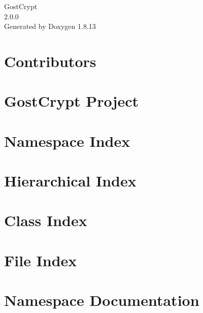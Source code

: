 \documentclass[twoside]{book}
\newcommand{\+}{\discretionary{\mbox{\scriptsize$\hookleftarrow$}}{}{}}
\newcommand{\clearemptydoublepage}{%
  \newpage{\pagestyle{empty}\cleardoublepage}%
}
\begin{document}
\hypersetup{pageanchor=false,
             bookmarksnumbered=true,
             pdfencoding=unicode
            }
\begin{titlepage}
\vspace*{7cm}
\begin{center}%
{\Large Gost\+Crypt \\[1ex]\large 2.\+0.\+0 }\\
\vspace*{1cm}
{\large Generated by Doxygen 1.8.13}\\
\end{center}
\end{titlepage}
\clearemptydoublepage
{}
\tableofcontents
\clearemptydoublepage
{}
\hypersetup{pageanchor=true}

\chapter{Contributors}
\label{md__contributors}

\chapter{Gost\+Crypt Project}
\label{md__r_e_a_d_m_e}

\chapter{Namespace Index}

\chapter{Hierarchical Index}

\chapter{Class Index}

\chapter{File Index}

\chapter{Namespace Documentation}





\end{document}
